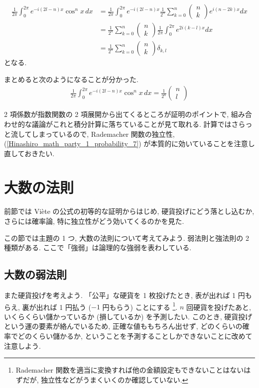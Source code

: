\documentclass[openany, a4paper, oneside]{jsbook}
\begin{document}
\begin{align}
 \frac{1}{2 \pi} \int_0^{2 \pi} e^{-i (2l -n) x} \cos^n x \, dx
 &=
 \frac{1}{2 \pi} \int_0^{2 \pi} e^{-i (2l -n) x}
  \frac{1}{2^n} \sum_{k=0}^n
  \begin{pmatrix}
   n \\
   k
  \end{pmatrix}
  e^{i (n - 2k) x} dx \\
 &=
 \frac{1}{2^n} \sum_{k=0}^n
  \begin{pmatrix}
   n \\
   k
  \end{pmatrix}
  \frac{1}{2 \pi}
  \int_0^{2 \pi} e^{2 i (k - l) x} dx \\
 &=
 \frac{1}{2^n} \sum_{k=0}^n
  \begin{pmatrix}
   n \\
   k
  \end{pmatrix}
  \delta_{k,l}
\end{align}
となる.

まとめると次のようになることが分かった.
\begin{align}
 \frac{1}{2 \pi} \int_0^{2 \pi} e^{-i (2l -n) x} \cos^n x \, dx
 =
 \frac{1}{2^n}
 \begin{pmatrix}
  n \\
  l
 \end{pmatrix} \label{Hinashiro_math_party_1_probability_9}
\end{align}

2 項係数が指数関数の 2 項展開から出てくるところが証明のポイントで,
組み合わせ的な議論がこれと積分計算に落ちていることが見て取れる.
計算ではさらっと流してしまっているので,
Rademacher 関数の独立性, (\ref{Hinashiro_math_party_1_probability_7}) が本質的に効いていることを注意し直しておきたい.
\section{大数の法則}

前節では Vi\`ete の公式の初等的な証明からはじめ, 硬貨投げにどう落とし込むか,
さらには確率論, 特に独立性がどう効いてくるのかを見た.

この節では主題の 1 つ, 大数の法則について考えてみよう.
弱法則と強法則の 2 種類がある.
ここで「強弱」は論理的な強弱を表わしている.
\subsection{大数の弱法則}

また硬貨投げを考えよう.
「公平」な硬貨を 1 枚投げたとき, 表が出れば 1 円もらえ, 裏が出れば 1 円払う ($-1$ 円もらう) ことにする \footnote{Rademacher 関数を適当に変換すれば他の金額設定もできないことはないはずだが, 独立性などがうまくいくのか確認していない.}.
$n$ 回硬貨を投げたあと, いくらくらい儲かっているか (損しているか) を予測したい.
このとき, 硬貨投げという運の要素が絡んでいるため, 正確な値ももちろん出せず,
どのくらいの確率でどのくらい儲かるか, ということを予測することしかできないことに改めて注意しよう.
\end{document}
